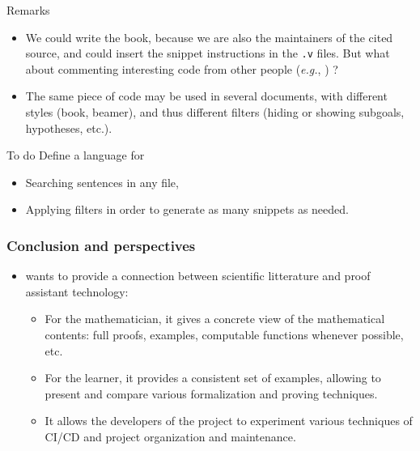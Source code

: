 \documentclass[10pt, fleqn]{beamer}
\begin{document}

\begin{frame}
    
  \begin{block}{Remarks}
    \begin{itemize}
    \item We could write the book, because we are also the maintainers of the cited \coq source, and could insert the snippet instructions in the \texttt{.v} files. \textcolor{lookcolor}{But what about commenting interesting code from other people (\emph{e.g.},
        \gaia) ?}
    \item The same  piece of \coq code may be used in several documents, with different styles (book, beamer), and thus
      different filters (hiding or showing subgoals, hypotheses, etc.).
      
    \end{itemize}
  \end{block}

  \begin{block}{To do}
    Define a language for
    \begin{itemize}
    \item Searching sentences in any \coq file,
    \item Applying filters in order to generate as many snippets as needed.
    \end{itemize}
  \end{block}
\end{frame}


\begin{frame}
  \frametitle{Conclusion and perspectives}
  \begin{block}{}
    \begin{itemize}
    \item \Hydras wants to provide  a connection between scientific litterature and proof assistant technology:
      \begin{itemize}
      \item For the mathematician, it gives a concrete view of the mathematical contents: full proofs, examples, computable functions whenever possible, etc.
        \item  For the \coq learner, it provides a consistent set of examples,
          allowing to present and compare various formalization and proving techniques.
          \item It allows the developers of the project to experiment various techniques of CI/CD and project organization and maintenance.
      \end{itemize}
    \end{itemize}
  \end{block}
  \end{frame}
\end{document}
